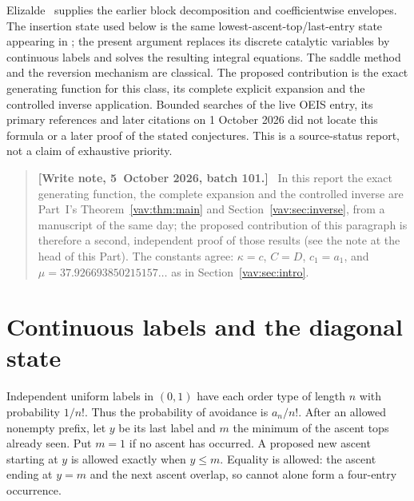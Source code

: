 \documentclass[11pt]{article}
\theoremstyle{remark}\newtheorem{remark}[theorem]{Remark}
\newenvironment{writenoteb}{\begin{quote}\small\raggedright\textbf{[Write note, 5~October 2026, batch 101.]}\ }{\end{quote}}
\begin{document}
Elizalde~\cite[Proposition 5.1]{elizalde} supplies the earlier block
decomposition and coefficientwise envelopes. The insertion state used below
is the same lowest-ascent-top/last-entry state appearing in
\cite[Proposition 11]{bck}; the present argument replaces its discrete
catalytic variables by continuous labels and solves the resulting integral
equations. The saddle method and the reversion mechanism are classical.
The proposed contribution is the exact generating function for this class,
its complete explicit expansion and the controlled inverse application.
Bounded searches of the live OEIS entry, its primary references and later
citations on 1 October 2026 did not locate this formula or a later proof of
the stated conjectures. This is a source-status report, not a claim of
exhaustive priority.
\begin{writenoteb}
In this report the exact generating function, the complete expansion and
the controlled inverse are Part~I's Theorem~\ref{vav:thm:main} and
Section~\ref{vav:sec:inverse}, from a manuscript of the same day; the
proposed contribution of this paragraph is therefore a second, independent
proof of those results (see the note at the head of this Part). The
constants agree: $\kappa=c$, $C=D$, $c_1=a_1$, and
$\mu=37.926693850215157\ldots$ as in Section~\ref{vav:sec:intro}.
\end{writenoteb}

\section{Continuous labels and the diagonal state}\label{vav:dg:sec:diagonal}
Independent uniform labels in $(0,1)$ have each order type of length $n$
with probability $1/n!$. Thus the probability of avoidance is $a_n/n!$.
After an allowed nonempty prefix, let $y$ be its last label and $m$ the
minimum of the ascent tops already seen. Put $m=1$ if no ascent has occurred.
A proposed new ascent starting at $y$ is allowed exactly when $y\le m$.
Equality is allowed: the ascent ending at $y=m$ and the next ascent overlap,
so cannot alone form a four-entry occurrence.
\end{document}
